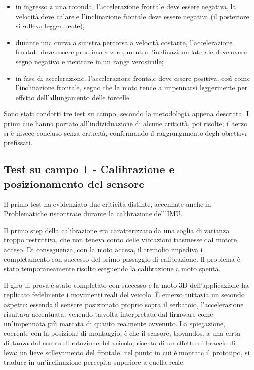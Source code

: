 \begin{itemize}
    \item in ingresso a una rotonda, l'accelerazione frontale deve essere
    negativa, la velocità deve calare e l'inclinazione frontale deve
    essere negativa (il posteriore si solleva leggermente);

    \item durante una curva a sinistra percorsa a velocità costante,
    l'accelerazione frontale deve essere prossima a zero, mentre
    l'inclinazione laterale deve avere segno negativo e rientrare in un range
    verosimile;

    \item in fase di accelerazione, l'accelerazione frontale deve essere
    positiva, così come l'inclinazione frontale, segno che la moto tende
    a impennarsi leggermente per effetto dell'allungamento delle forcelle.
\end{itemize}

\label{subsec:test_campo}
Sono stati condotti tre test su campo, secondo la metodologia appena
descritta. I primi due hanno portato all'individuazione di alcune
criticità, poi risolte; il terzo si è invece concluso senza criticità, 
confermando il raggiungimento degli obiettivi prefissati.


\subsection{Test su campo 1 - Calibrazione e posizionamento del sensore}
\label{subsubsec:test_campo_1}

Il primo test ha evidenziato due criticità distinte, accennate anche in
\hyperref[subsec:prob_risc_calib_imu]{Problematiche riscontrate durante la
calibrazione dell'IMU}.

Il primo step della calibrazione era caratterizzato da una soglia di varianza
troppo restrittiva, che non teneva conto delle vibrazioni trasmesse dal
motore acceso. Di conseguenza, con la moto accesa, il tremolio impediva il
completamento con successo del primo passaggio di calibrazione. Il problema
è stato temporaneamente risolto eseguendo la calibrazione a moto spenta.

Il giro di prova è stato completato con successo e la moto 3D
dell'applicazione ha replicato fedelmente i movimenti reali del veicolo. È
emerso tuttavia un secondo aspetto: essendo il sensore posizionato proprio
sopra il serbatoio, l'accelerazione risultava accentuata, venendo talvolta
interpretata dal firmware come un'impennata più marcata di quanto realmente
avvenuto. La spiegazione, coerente con la posizione di montaggio, è che il
sensore, trovandosi a una certa distanza dal centro di rotazione del
veicolo, risenta di un effetto di braccio di leva: un lieve sollevamento del
frontale, nel punto in cui è montato il prototipo, si traduce in
un'inclinazione percepita superiore a quella reale.

